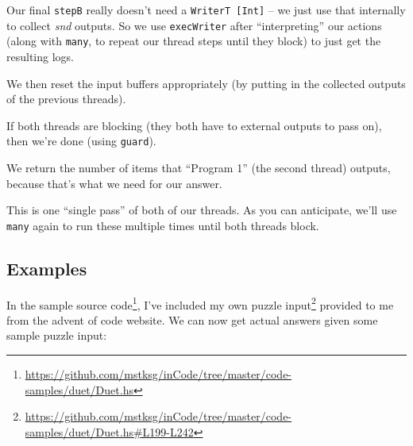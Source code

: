 \documentclass[]{article}
\newenvironment{Shaded}{}{}
\newcommand{\CharTok}[1]{\textcolor[rgb]{0.25,0.44,0.63}{#1}}
\newcommand{\CommentTok}[1]{\textcolor[rgb]{0.38,0.63,0.69}{\textit{#1}}}
\newcommand{\DataTypeTok}[1]{\textcolor[rgb]{0.56,0.13,0.00}{#1}}
\newcommand{\DecValTok}[1]{\textcolor[rgb]{0.25,0.63,0.44}{#1}}
\newcommand{\FunctionTok}[1]{\textcolor[rgb]{0.02,0.16,0.49}{#1}}
\newcommand{\KeywordTok}[1]{\textcolor[rgb]{0.00,0.44,0.13}{\textbf{#1}}}
\newcommand{\NormalTok}[1]{#1}
\newcommand{\OtherTok}[1]{\textcolor[rgb]{0.00,0.44,0.13}{#1}}
\renewcommand{\href}[2]{#2\footnote{\url{#1}}}
\begin{document}
Our final \texttt{stepB} really doesn't need a \texttt{WriterT\ {[}Int{]}} -- we
just use that internally to collect \emph{snd} outputs. So we use
\texttt{execWriter} after ``interpreting'' our actions (along with
\texttt{many}, to repeat our thread steps until they block) to just get the
resulting logs.

We then reset the input buffers appropriately (by putting in the collected
outputs of the previous threads).

If both threads are blocking (they both have to external outputs to pass on),
then we're done (using \texttt{guard}).

We return the number of items that ``Program 1'' (the second thread) outputs,
because that's what we need for our answer.

This is one ``single pass'' of both of our threads. As you can anticipate, we'll
use \texttt{many} again to run these multiple times until both threads block.

\begin{Shaded}
\end{Shaded}

\hypertarget{examples}{%
\subsection{Examples}\label{examples}}

In the
\href{https://github.com/mstksg/inCode/tree/master/code-samples/duet/Duet.hs}{sample
source code}, I've included
\href{https://github.com/mstksg/inCode/tree/master/code-samples/duet/Duet.hs\#L199-L242}{my
own puzzle input} provided to me from the advent of code website. We can now get
actual answers given some sample puzzle input:
\end{document}
